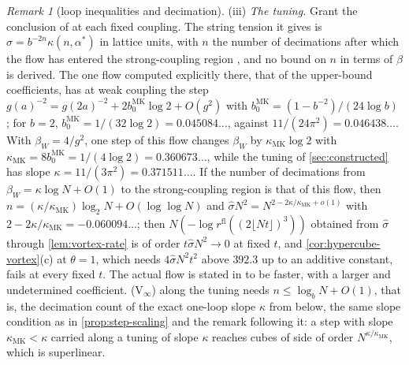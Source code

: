 \documentclass[11pt,a4paper]{amsart}
\theoremstyle{definition}
\theoremstyle{remark}
\newtheorem{remark}[theorem]{Remark}
\numberwithin{equation}{section}
\newcommand{\cube}[1]{(2#1)^3}             %
\newcommand{\betaW}{\beta_{W}}             %
\begin{document}
\begin{remark}[loop inequalities and decimation]
(iii) \emph{The tuning.} Grant the conclusion of \cite{tomboulis2007} at each fixed coupling. The string tension it gives is $\hat\sigma=b^{-2n}\kappa(n,\alpha^*)$ in lattice units, with $n$ the number of decimations after which the flow has entered the strong-coupling region \cite[eqs.~(6.16), (6.17)]{tomboulis2007}, and no bound on $n$ in terms of $\beta$ is derived. The one flow computed explicitly there, that of the upper-bound coefficients, has at weak coupling the step $g(a)^{-2}=g(2a)^{-2}+2b_0^{\mathrm{MK}}\log2+O(g^2)$ with $b_0^{\mathrm{MK}}=(1-b^{-2})/(24\log b)$ \cite[eq.~(6.24)]{tomboulis2007}; for $b=2$, $b_0^{\mathrm{MK}}=1/(32\log2)=0.045084\ldots$, against $11/(24\pi^2)=0.046438\ldots$. With $\betaW=4/g^2$, one step of this flow changes $\betaW$ by $\kappa_{\mathrm{MK}}\log2$ with $\kappa_{\mathrm{MK}}=8b_0^{\mathrm{MK}}=1/(4\log2)=0.360673\ldots$, while the tuning of \cref{sec:constructed} has slope $\kappa=11/(3\pi^2)=0.371511\ldots$. If the number of decimations from $\betaW=\kappa\log N+O(1)$ to the strong-coupling region is that of this flow, then $n=(\kappa/\kappa_{\mathrm{MK}})\log_2N+O(\log\log N)$ and $\hat\sigma N^2=N^{2-2\kappa/\kappa_{\mathrm{MK}}+o(1)}$ with $2-2\kappa/\kappa_{\mathrm{MK}}=-0.060094\ldots$; then $N(-\log r^{\mathrm{fl}}(\cube{\lfloor Nt\rfloor}))$ obtained from $\hat\sigma$ through \cref{lem:vortex-rate} is of order $t\hat\sigma N^2\to0$ at fixed $t$, and \cref{cor:hypercube-vortex}\textup{(c)} at $\theta=1$, which needs $4\hat\sigma N^2t^2$ above $392.3$ up to an additive constant, fails at every fixed $t$. The actual flow is stated in \cite[Section~6.3]{tomboulis2007} to be faster, with a larger and undetermined coefficient. \textup{(V$_\infty$)} along the tuning needs $n\le\log_bN+O(1)$, that is, the decimation count of the exact one-loop slope $\kappa$ from below, the same slope condition as in \cref{prop:step-scaling} and the remark following it: a step with slope $\kappa_{\mathrm{MK}}<\kappa$ carried along a tuning of slope $\kappa$ reaches cubes of side of order $N^{\kappa/\kappa_{\mathrm{MK}}}$, which is superlinear.


\end{remark}
\end{document}
